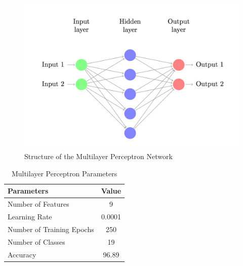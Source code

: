 \documentclass[12pt]{article}
\theoremstyle{definition}
\begin{document}
		\begin{figure}
			\centering
			\includegraphics[width=400pt]{pictures/mlp-network-diagram.png}
			\caption{Structure of the Multilayer Perceptron Network}
			\label{fig:mlp-net}
		\end{figure}
		
		\begin{table}[h!]
			\centering
			\caption{Multilayer Perceptron Parameters}
			\label{tab:model-1-params}
			\begin{tabular}{|l|c|}
				\hline
				\bfseries{Parameters} & \textbf{Value} \\ \hline
				Number of Features & 9 \\
				Learning Rate & 0.0001 \\
				Number of Training Epochs & 250 \\
				Number of Classes & 19 \\ 
				Accuracy & 96.89 \\
				\hline	
			\end{tabular}
			
		\end{table}
		
\end{document}
